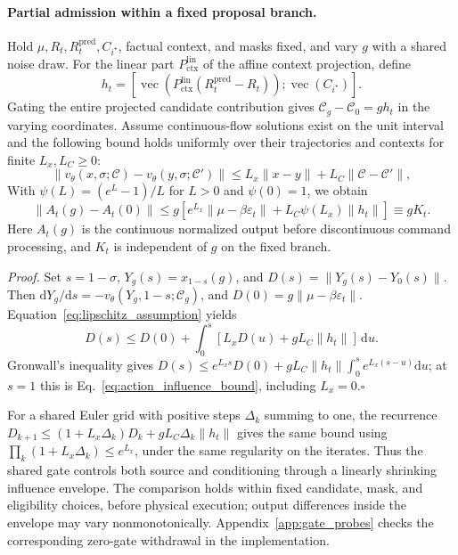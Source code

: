 \paragraph{Partial admission within a fixed proposal branch.}
Hold $\mu,R_t,R_t^{\mathrm{pred}},C_{i^\star}$, factual context, and masks fixed, and vary $g$ with a shared noise draw.
For the linear part $P_{\mathrm{ctx}}^{\mathrm{lin}}$ of the affine context projection, define
\begin{equation}
 h_t=\left[\operatorname{vec}\!\left(P_{\mathrm{ctx}}^{\mathrm{lin}}
 (R_t^{\mathrm{pred}}-R_t)\right);\operatorname{vec}(C_{i^\star})\right].
 \label{eq:context_direction}
\end{equation}
Gating the entire projected candidate contribution gives $\mathcal C_g-\mathcal C_0=gh_t$ in the varying coordinates.
Assume continuous-flow solutions exist on the unit interval and the following bound holds uniformly over their trajectories and contexts for finite $L_x,L_C\geq0$:
\begin{equation}
 \|v_\theta(x,\sigma;\mathcal C)-v_\theta(y,\sigma;\mathcal C')\|
 \leq L_x\|x-y\|+L_C\|\mathcal C-\mathcal C'\|,
 \label{eq:lipschitz_assumption}
\end{equation}
With $\psi(L)=(e^L-1)/L$ for $L>0$ and $\psi(0)=1$, we obtain
\begin{equation}
 \|A_t(g)-A_t(0)\|\leq g\left[
 e^{L_x}\|\mu-\beta\varepsilon_t\|+L_C\psi(L_x)\|h_t\|\right]
 \equiv gK_t.
 \label{eq:action_influence_bound}
\end{equation}
Here $A_t(g)$ is the continuous normalized output before discontinuous command processing, and $K_t$ is independent of $g$ on the fixed branch.

\noindent\emph{Proof.}
Set $s=1-\sigma$, $Y_g(s)=x_{1-s}(g)$, and $D(s)=\|Y_g(s)-Y_0(s)\|$.
Then $\mathrm dY_g/\mathrm ds=-v_\theta(Y_g,1-s;\mathcal C_g)$, and $D(0)=g\|\mu-\beta\varepsilon_t\|$.
Equation~\eqref{eq:lipschitz_assumption} yields
\[
 D(s)\leq D(0)+\int_0^s[L_xD(u)+gL_C\|h_t\|]\,\mathrm du.
\]
Gronwall's inequality gives
$D(s)\leq e^{L_xs}D(0)+gL_C\|h_t\|\int_0^se^{L_x(s-u)}\mathrm du$;
at $s=1$ this is Eq.~\eqref{eq:action_influence_bound}, including $L_x=0$.\hfill$\square$

For a shared Euler grid with positive steps $\Delta_k$ summing to one, the recurrence
$D_{k+1}\leq(1+L_x\Delta_k)D_k+gL_C\Delta_k\|h_t\|$
gives the same bound using $\prod_k(1+L_x\Delta_k)\leq e^{L_x}$, under the same regularity on the iterates.
Thus the shared gate controls both source and conditioning through a linearly shrinking influence envelope.
The comparison holds within fixed candidate, mask, and eligibility choices, before physical execution; output differences inside the envelope may vary nonmonotonically.
Appendix~\ref{app:gate_probes} checks the corresponding zero-gate withdrawal in the implementation.

